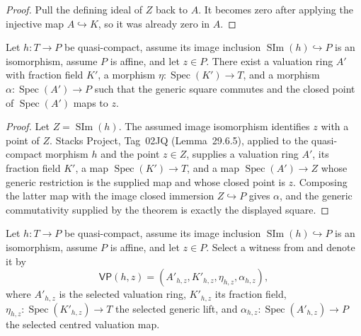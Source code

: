 \begin{proof}
  \leanok
  Pull the defining ideal of $Z$ back to $A$.  It becomes zero after applying
  the injective map $A\hookrightarrow K$, so it was already zero in $A$.
\end{proof}

\begin{lemma}
  \label{lemma:nagata-dense-valuation-probe-exists}
  \leanok

  Let $h\colon T\to P$ be quasi-compact, assume its image
  inclusion $\operatorname{SIm}(h)\hookrightarrow P$ is an isomorphism, assume
  $P$ is affine, and let $z\in P$.  There
  exist a valuation ring $A'$ with fraction field $K'$, a morphism
  $\eta\colon\operatorname{Spec}(K')\to T$, and a morphism
  $\alpha\colon\operatorname{Spec}(A')\to P$ such that the generic square
  commutes and the closed point of $\operatorname{Spec}(A')$ maps to $z$.
\end{lemma}

\begin{proof}
  \leanok
  Let $Z=\operatorname{SIm}(h)$.  The assumed image isomorphism identifies
  $z$ with a point of $Z$.  Stacks Project, Tag~02JQ (Lemma~29.6.5),
  applied to the quasi-compact morphism $h$ and the point $z\in Z$, supplies
  a valuation ring $A'$, its fraction field $K'$, a map
  $\operatorname{Spec}(K')\to T$, and a map
  $\operatorname{Spec}(A')\to Z$ whose generic restriction is the supplied
  map and whose closed point is $z$.  Composing the latter map with the image
  closed immersion $Z\hookrightarrow P$ gives $\alpha$, and the generic
  commutativity supplied by the theorem is exactly the displayed square.
\end{proof}

\begin{definition}
  \label{def:nagata-dense-valuation-probe}
  \leanok

  Let $h\colon T\to P$ be quasi-compact, assume its image
  inclusion $\operatorname{SIm}(h)\hookrightarrow P$ is an isomorphism, assume
  $P$ is affine, and let $z\in P$.
  Select a witness from
   and denote it by
  \[
    \mathsf{VP}(h,z)=
      (A'_{h,z},K'_{h,z},\eta_{h,z},\alpha_{h,z}),
  \]
  where $A'_{h,z}$ is the selected valuation ring, $K'_{h,z}$ its fraction
  field, $\eta_{h,z}\colon\operatorname{Spec}(K'_{h,z})\to T$ the selected
  generic lift, and
  $\alpha_{h,z}\colon\operatorname{Spec}(A'_{h,z})\to P$ the selected centred
  valuation map.
\end{definition}

